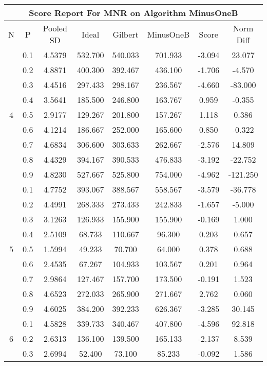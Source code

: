 \documentclass[11pt,a4paper]{report}
\begin{document}
\begin{longtable}{ | c | c || c | c | c | c | c | c | }
\hline
\multicolumn{8}{|c|}{ Score Report For MNR on Algorithm MinusOneB} \\
\hline
N & P & Pooled SD &  Ideal &  Gilbert & MinusOneB  & Score & Norm Diff \\
 \hline
 \hline
 \endhead
\multirow{9}{*}{4} & 0.1 & 4.5379 & 532.700 & 540.033 & 701.933 & -3.094 & 23.077 \\
 & 0.2 & 4.8871 & 400.300 & 392.467 & 436.100 & -1.706 & -4.570 \\
 & 0.3 & 4.4516 & 297.433 & 298.167 & 236.567 & -4.660 & -83.000 \\
 & 0.4 & 3.5641 & 185.500 & 246.800 & 163.767 & 0.959 & -0.355 \\
 & 0.5 & 2.9177 & 129.267 & 201.800 & 157.267 & 1.118 & 0.386 \\
 & 0.6 & 4.1214 & 186.667 & 252.000 & 165.600 & 0.850 & -0.322 \\
 & 0.7 & 4.6834 & 306.600 & 303.633 & 262.667 & -2.576 & 14.809 \\
 & 0.8 & 4.4329 & 394.167 & 390.533 & 476.833 & -3.192 & -22.752 \\
 & 0.9 & 4.8230 & 527.667 & 525.800 & 754.000 & -4.962 & -121.250 \\
 \hline
\multirow{9}{*}{5} & 0.1 & 4.7752 & 393.067 & 388.567 & 558.567 & -3.579 & -36.778 \\
 & 0.2 & 4.4991 & 268.333 & 273.433 & 242.833 & -1.657 & -5.000 \\
 & 0.3 & 3.1263 & 126.933 & 155.900 & 155.900 & -0.169 & 1.000 \\
 & 0.4 & 2.5109 & 68.733 & 110.667 & 96.300 & 0.203 & 0.657 \\
 & 0.5 & 1.5994 & 49.233 & 70.700 & 64.000 & 0.378 & 0.688 \\
 & 0.6 & 2.4535 & 67.267 & 104.933 & 103.567 & 0.201 & 0.964 \\
 & 0.7 & 2.9864 & 127.467 & 157.700 & 173.500 & -0.191 & 1.523 \\
 & 0.8 & 4.6523 & 272.033 & 265.900 & 271.667 & 2.762 & 0.060 \\
 & 0.9 & 4.6025 & 384.200 & 392.233 & 626.367 & -3.285 & 30.145 \\
 \hline
\multirow{9}{*}{6} & 0.1 & 4.5828 & 339.733 & 340.467 & 407.800 & -4.596 & 92.818 \\
 & 0.2 & 2.6313 & 136.100 & 139.500 & 165.133 & -2.137 & 8.539 \\
 & 0.3 & 2.6994 & 52.400 & 73.100 & 85.233 & -0.092 & 1.586 \\

\end{longtable}
\end{document}
